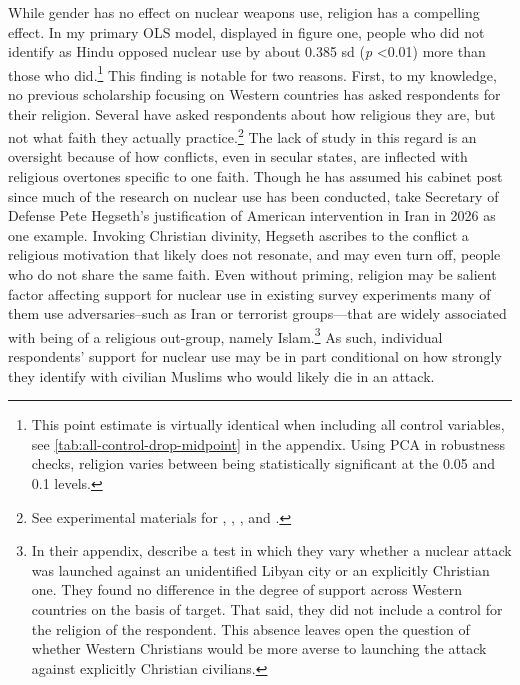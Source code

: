 \documentclass[12pt]{article}
\begin{document}
While gender has no effect on nuclear weapons use, religion has a compelling effect. In my primary OLS model, displayed in figure one, people who did not identify as Hindu opposed nuclear use by about 0.385 sd (\textit{p} \textless 0.01) more than those who did.\footnote{This point estimate is virtually identical when including all control variables, see \autoref{tab:all-control-drop-midpoint} in the appendix. Using PCA in robustness checks, religion varies between being statistically significant at the 0.05 and 0.1 levels.} This finding is notable for two reasons. First, to my knowledge, no previous scholarship focusing on Western countries has asked respondents for their religion. Several have asked respondents about how religious they are, but not what faith they actually practice.\footnote{See experimental materials for \cite{press_atomic_2013}, \citet{sagan_revisiting_2017}, \citet{dill_kettles_2022}, and \cite{schwartz_when_2024}.} The lack of study in this regard is an oversight because of how conflicts, even in secular states, are inflected with religious overtones specific to one faith. Though he has assumed his cabinet post since much of the research on nuclear use has been conducted, take Secretary of Defense Pete Hegseth's justification of American intervention in Iran in 2026 as one example. Invoking Christian divinity, Hegseth ascribes to the conflict a religious motivation that likely does not resonate, and may even turn off, people who do not share the same faith. Even without priming, religion may be salient factor affecting support for nuclear use in existing survey experiments many of them use adversaries–such as Iran or terrorist groups—that are widely associated with being of a religious out-group, namely Islam.\footnote{In their appendix, \citet{dill_kettles_2022} describe a test in which they vary whether a nuclear attack was launched against an unidentified Libyan city or an explicitly Christian one. They found no difference in the degree of support across Western countries on the basis of target. That said, they did not include a control for the religion of the respondent. This absence leaves open the question of whether Western Christians would be more averse to launching the attack against explicitly Christian civilians.} As such, individual respondents' support for nuclear use may be in part conditional on how strongly they identify with civilian Muslims who would likely die in an attack.
\end{document}
